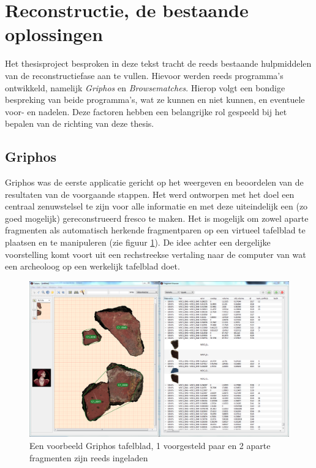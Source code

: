 \section{Reconstructie, de bestaande oplossingen}
Het thesisproject besproken in deze tekst tracht de reeds bestaande hulpmiddelen van de reconstructiefase aan te vullen. Hievoor werden reeds programma's ontwikkeld, namelijk \emph{Griphos} en \emph{Browsematches}. Hierop volgt een bondige bespreking van beide programma's, wat ze kunnen en niet kunnen, en eventuele voor- en nadelen. Deze factoren hebben een belangrijke rol gespeeld bij het bepalen van de richting van deze thesis.

\subsection{Griphos}

Griphos was de eerste applicatie gericht op het weergeven en beoordelen van de resultaten van de voorgaande stappen. Het werd ontworpen met het doel een centraal zenuwstelsel te zijn voor alle informatie en met deze uiteindelijk een (zo goed mogelijk) gereconstrueerd fresco te maken. Het is mogelijk om zowel aparte fragmenten als automatisch herkende fragmentparen op een virtueel tafelblad te plaatsen en te manipuleren (zie figuur \ref{fig:griphostafelblad}). De idee achter een dergelijke voorstelling komt voort uit een rechstreekse vertaling naar de computer van wat een archeoloog op een werkelijk tafelblad doet.\\

\begin{figure}[ht]
	\begin{center}
		\includegraphics[width=.8\columnwidth]{images/griphos-01-cut.png}
		\caption{Een voorbeeld Griphos tafelblad, 1 voorgesteld paar en 2 aparte fragmenten zijn reeds ingeladen}
		\label{fig:griphostafelblad}
	\end{center}
\end{figure}

